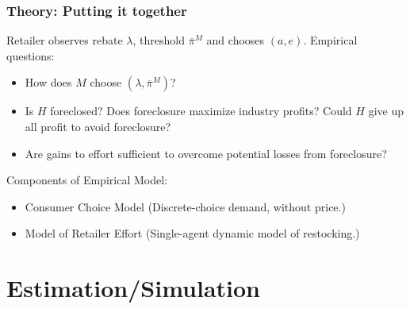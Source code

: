 \documentclass[aspectratio=169]{beamer}
\begin{document}
\begin{frame}
\frametitle{Theory: Putting it together}
\small
Retailer observes rebate $\lambda$, threshold $\overline{\pi}^M$ and chooses $(a,e)$.
\vfill
Empirical questions:
\begin{itemize}
\item How does $M$ choose $(\lambda,\overline{\pi}^M)$?
\item Is $H$ foreclosed? Does foreclosure maximize industry profits? Could $H$ give up all profit to avoid foreclosure?
\item Are gains to effort sufficient to overcome potential losses from foreclosure?
\end{itemize}
Components of Empirical Model:
\begin{itemize}
\item Consumer Choice Model (Discrete-choice demand, without price.)
\item Model of Retailer Effort (Single-agent dynamic model of restocking.)
\end{itemize}
\end{frame}



\section{Estimation/Simulation}
\end{document}
